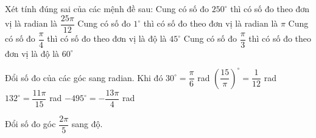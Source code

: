 \begin{ex}%
	Xét  tính đúng sai của các mệnh đề sau:
	 \choiceTF
		{\True Cung có số đo $250^\circ $ thì có số đo theo đơn vị là  radian là $\dfrac{25\pi}{12}$}
		{Cung có  số đo $1^\circ $ thì có số đo theo đơn vị là radian là $\pi $}
		{\True Cung có số đo $\dfrac{\pi}{4}$ thì có số đo theo đơn vị là độ là  $45^\circ$}
		{\True  Cung có số đo $\dfrac{\pi}{3}$ thì có số đo theo đơn vị là độ là $60^\circ$}
\end{ex}

\begin{ex}%
	Đổi số đo của các góc  sang radian. Khi đó
	 \choiceTF
		 {\True $30^\circ=\dfrac{\pi}{6}$ rad}
		{\True $\left( \dfrac{15}{\pi} \right)^\circ=\dfrac{1}{12}$  rad}
		{\True $132^\circ=\dfrac{11\pi}{15}$  rad}
		{$-495^\circ=-\dfrac{13\pi}{4}$ rad} 
\end{ex}



\begin{ex}%
	Đổi số  đo góc $\dfrac{2\pi}{5}$ sang độ.
\end{ex}

